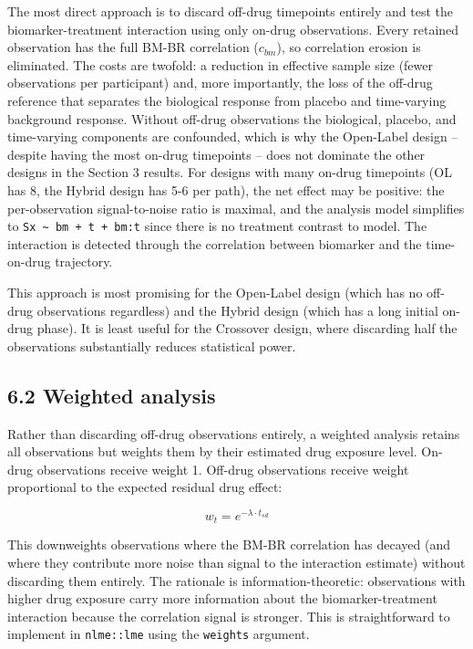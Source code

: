 \documentclass[11pt]{article}
\begin{document}
The most direct approach is to discard off-drug timepoints
entirely and test the biomarker-treatment interaction using only
on-drug observations. Every retained observation has the full
BM-BR correlation ($c_{bm}$), so correlation erosion is
eliminated. The costs are twofold: a reduction in effective
sample size (fewer observations per participant) and, more
importantly, the loss of the off-drug reference that separates
the biological response from placebo and time-varying
background response. Without off-drug observations the
biological, placebo, and time-varying components are confounded,
which is why the Open-Label design -- despite having the most
on-drug timepoints -- does not dominate the other designs in
the Section 3 results. For designs with many
on-drug timepoints (OL has 8, the Hybrid design has 5-6 per
path), the net effect may be positive: the per-observation
signal-to-noise ratio is maximal, and the analysis model
simplifies to \texttt{Sx \textasciitilde{} bm + t + bm:t} since there is no treatment
contrast to model. The interaction is detected through the
correlation between biomarker and the time-on-drug trajectory.

This approach is most promising for the Open-Label design (which
has no off-drug observations regardless) and the Hybrid design
(which has a long initial on-drug phase). It is least useful for
the Crossover design, where discarding half the observations
substantially reduces statistical power.

\subsection{6.2 Weighted analysis}

Rather than discarding off-drug observations entirely, a weighted
analysis retains all observations but weights them by their
estimated drug exposure level. On-drug observations receive
weight 1. Off-drug observations receive weight proportional to
the expected residual drug effect:

\[w_t = e^{-\lambda \cdot t_{sd}}\]

This downweights observations where the BM-BR correlation has
decayed (and where they contribute more noise than signal to the
interaction estimate) without discarding them entirely. The
rationale is information-theoretic: observations with higher drug
exposure carry more information about the biomarker-treatment
interaction because the correlation signal is stronger. This is
straightforward to implement in \texttt{nlme::lme} using the \texttt{weights}
argument.
\end{document}
